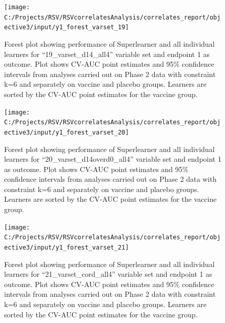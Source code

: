 \documentclass[11pt]{article}
\begin{document}
\begin{figure}[H]

{\centering \texttt{[image: C:/Projects/RSV/RSVcorrelatesAnalysis/correlates\_report/objective3/input/y1\_forest\_varset\_19]} 

}

\caption[Forest plot for ``19\_varset\_d14\_all4'' variable set, endpoint 1.]{Forest plot showing performance of Superlearner and all individual learners for ``19\_varset\_d14\_all4'' variable set and endpoint 1 as outcome. Plot shows CV-AUC point estimates and 95\% confidence intervals from analyses carried out on Phase 2 data with constraint k=6 and separately on vaccine and placebo groups. Learners are sorted by the CV-AUC point estimates for the vaccine group.}\label{fig:y1-forest-varset-19}
\end{figure}

\begin{figure}[H]

{\centering \texttt{[image: C:/Projects/RSV/RSVcorrelatesAnalysis/correlates\_report/objective3/input/y1\_forest\_varset\_20]} 

}

\caption[Forest plot for ``20\_varset\_d14overd0\_all4'' variable set, endpoint 1.]{Forest plot showing performance of Superlearner and all individual learners for ``20\_varset\_d14overd0\_all4'' variable set and endpoint 1 as outcome. Plot shows CV-AUC point estimates and 95\% confidence intervals from analyses carried out on Phase 2 data with constraint k=6 and separately on vaccine and placebo groups. Learners are sorted by the CV-AUC point estimates for the vaccine group.}\label{fig:y1-forest-varset-20}
\end{figure}

\begin{figure}[H]

{\centering \texttt{[image: C:/Projects/RSV/RSVcorrelatesAnalysis/correlates\_report/objective3/input/y1\_forest\_varset\_21]} 

}

\caption[Forest plot for ``21\_varset\_cord\_all4'' variable set, endpoint 1.]{Forest plot showing performance of Superlearner and all individual learners for ``21\_varset\_cord\_all4'' variable set and endpoint 1 as outcome. Plot shows CV-AUC point estimates and 95\% confidence intervals from analyses carried out on Phase 2 data with constraint k=6 and separately on vaccine and placebo groups. Learners are sorted by the CV-AUC point estimates for the vaccine group.}\label{fig:y1-forest-varset-21}
\end{figure}
\end{document}

